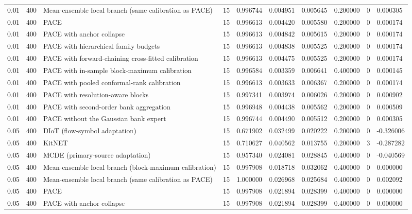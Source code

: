 \begin{tabular}{llllllllll}
0.01 & 400 & Mean-ensemble local branch (same calibration as PACE) & 15 & 0.996744 & 0.004951 & 0.005645 & 0.200000 & 0 & 0.000305 \\
0.01 & 400 & PACE & 15 & 0.996613 & 0.004420 & 0.005580 & 0.200000 & 0 & 0.000174 \\
0.01 & 400 & PACE with anchor collapse & 15 & 0.996613 & 0.004842 & 0.005615 & 0.200000 & 0 & 0.000174 \\
0.01 & 400 & PACE with hierarchical family budgets & 15 & 0.996613 & 0.004838 & 0.005525 & 0.200000 & 0 & 0.000174 \\
0.01 & 400 & PACE with forward-chaining cross-fitted calibration & 15 & 0.996613 & 0.004475 & 0.005525 & 0.200000 & 0 & 0.000174 \\
0.01 & 400 & PACE with in-sample block-maximum calibration & 15 & 0.996584 & 0.003359 & 0.006641 & 0.400000 & 0 & 0.000145 \\
0.01 & 400 & PACE with pooled conformal-rank calibration & 15 & 0.996613 & 0.003633 & 0.006367 & 0.200000 & 0 & 0.000174 \\
0.01 & 400 & PACE with resolution-aware blocks & 15 & 0.997341 & 0.003974 & 0.006026 & 0.200000 & 0 & 0.000902 \\
0.01 & 400 & PACE with second-order bank aggregation & 15 & 0.996948 & 0.004438 & 0.005562 & 0.200000 & 0 & 0.000509 \\
0.01 & 400 & PACE without the Gaussian bank expert & 15 & 0.996744 & 0.004490 & 0.005512 & 0.200000 & 0 & 0.000305 \\
0.05 & 400 & DIoT (flow-symbol adaptation) & 15 & 0.671902 & 0.032499 & 0.020222 & 0.200000 & 0 & -0.326006 \\
0.05 & 400 & KitNET & 15 & 0.710627 & 0.040562 & 0.013755 & 0.200000 & 3 & -0.287282 \\
0.05 & 400 & MCDE (primary-source adaptation) & 15 & 0.957340 & 0.024081 & 0.028845 & 0.400000 & 0 & -0.040569 \\
0.05 & 400 & Mean-ensemble local branch (block-maximum calibration) & 15 & 0.997908 & 0.018718 & 0.032062 & 0.400000 & 0 & 0.000000 \\
0.05 & 400 & Mean-ensemble local branch (same calibration as PACE) & 15 & 1.000000 & 0.026968 & 0.025684 & 0.400000 & 0 & 0.002092 \\
0.05 & 400 & PACE & 15 & 0.997908 & 0.021894 & 0.028399 & 0.400000 & 0 & 0.000000 \\
0.05 & 400 & PACE with anchor collapse & 15 & 0.997908 & 0.021894 & 0.028399 & 0.400000 & 0 & 0.000000 \\

\end{tabular}

